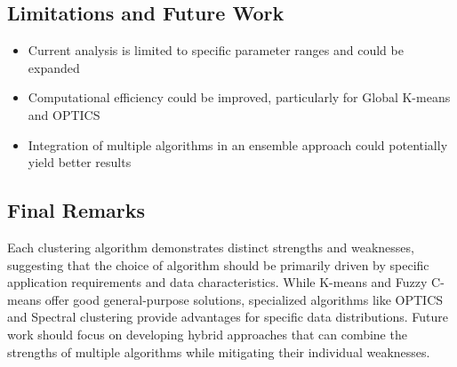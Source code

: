 \subsection{Limitations and Future Work}

\begin{itemize}
    \item Current analysis is limited to specific parameter ranges and could be expanded
    \item Computational efficiency could be improved, particularly for Global K-means and OPTICS
    \item Integration of multiple algorithms in an ensemble approach could potentially yield better results
\end{itemize}

\subsection{Final Remarks}

Each clustering algorithm demonstrates distinct strengths and weaknesses, suggesting that the choice of algorithm should be primarily driven by specific application requirements and data characteristics. While K-means and Fuzzy C-means offer good general-purpose solutions, specialized algorithms like OPTICS and Spectral clustering provide advantages for specific data distributions. Future work should focus on developing hybrid approaches that can combine the strengths of multiple algorithms while mitigating their individual weaknesses.

